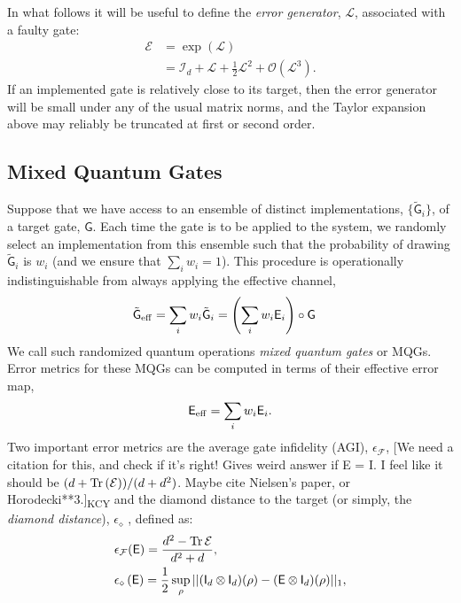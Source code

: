 \documentclass[aps,nofootinbib,pra,notitlepage,twocolumn]{revtex4-1}
\newcommand{\tr}{{\rm Tr\thinspace}}
\newcommand{\order}[1]{\mathcal{O}\left( #1 \right)}
\newcommand{\kcy}[1]{{\color{red}[#1]\textsubscript{\rm{KCY}}}}
\newcommand{\actual}{\ensuremath{\tilde{\mathsf{G}}}}
\newcommand{\target}{\ensuremath{{\mathsf{G}}}}
\newcommand{\error}{\ensuremath{{\mathsf{E}}}}
\newcommand{\errmat}{\ensuremath{{\mathcal{E}}}}
\newcommand{\genmat}{\ensuremath{{\mathcal{L}}}}
\newcommand{\AGI}{\ensuremath{\epsilon_\mathcal{F}}}
\newcommand{\dnorm}{\ensuremath{\epsilon_\diamond}}
\newcommand{\identmat}{\ensuremath{\mathcal{I}}}
\newcommand{\ident}{\ensuremath{\mathsf{I}}}
\newcommand{\0}{\ensuremath{\mathbf{0}}}
\newcommand{\weight}{\ensuremath{w}}
\begin{document}
In what follows it will be useful to define the \emph{error generator}, $\genmat$, associated with a faulty gate: 
\begin{align}
	\errmat 
		&= \exp\left(\genmat\right) \\
	\label{eq:generator}
		&= \identmat_d + \genmat + \frac{1}{2}\genmat^2 + \order{\genmat^3}.
\end{align}
If an implemented gate is relatively close to its target, then the error generator will be small under any of the usual matrix norms, and the Taylor expansion above may reliably be truncated at first or second order. 


\subsection{Mixed Quantum Gates}
\label{sec:mqg}
\noindent Suppose that we have access to an ensemble of distinct implementations, 
$\{\actual_i\}$, of a target gate, $\target$.
Each time the gate is to be applied to the system, we randomly select an implementation from this ensemble such that the probability of drawing $\actual_i$ is $\weight_i$ (and we ensure that $\sum_i \weight_i=1$). This procedure is operationally indistinguishable from always applying the effective channel, 
\begin{align}
	\actual_{\rm eff} &= \sum_i \weight_i \actual_i = \left(\sum_i \weight_i \error_i \right) \circ\target
\end{align}
We call such randomized quantum operations \emph{mixed quantum gates} or MQGs. Error metrics for these MQGs can be computed in terms of their effective error map, 
\begin{equation}
	\label{eq:effective_error}
	\error_{\rm eff} = \sum_i \weight_i \error_i.
\end{equation}
Two important error metrics are the average gate infidelity (AGI), $\AGI$, \kcy{We need a citation for this, and check if it's right! Gives weird answer if E = I. I feel like it should be $(d + \tr(\errmat))/(d+d^2)$. Maybe cite Nielsen's paper, or Horodecki**3.} and the diamond distance to the target (or simply, the \emph{diamond distance}), $\dnorm$ \cite{watrous2018theory}, defined as:
\begin{align}
	\label{eq:def_agi}
	&\AGI(\error) = \frac{d^2 - \tr{\errmat}}{d^2 + d},\\
	\label{eq:def_diamond}
	&\dnorm \left(\error\right)
		= \frac{1}{2} \sup_\rho \vert \vert (\ident_d\otimes \ident_d)(\rho) 
										  - (\error \otimes \ident_d)(\rho) \vert\vert_1,
\end{align}
\end{document}
